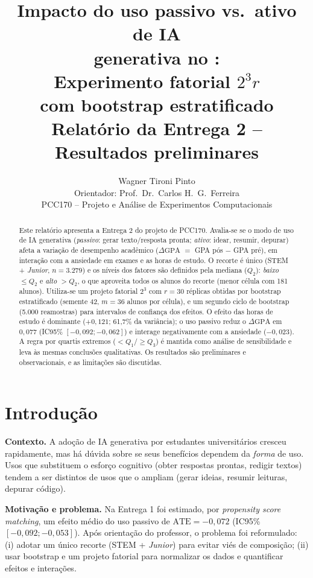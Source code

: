 \documentclass[12pt,a4paper]{article}
\title{\textbf{Impacto do uso passivo vs.\ ativo de IA\\generativa no \dgpa{}:\\Experimento fatorial $2^3 r$\\com bootstrap estratificado}\\[0.3em]
\large Relat\'orio da Entrega 2 -- Resultados preliminares}
\author{Wagner Tironi Pinto\\[0.2em]
\small Orientador: Prof.\ Dr.\ Carlos H.\ G.\ Ferreira\\
\small PCC170 -- Projeto e An\'alise de Experimentos Computacionais}
\date{}
\newcommand{\dgpa}{\ensuremath{\Delta\mathrm{GPA}}}
\begin{document}
\maketitle

\begin{abstract}
Este relat\'orio apresenta a Entrega 2 do projeto de PCC170. Avalia-se se o modo de uso de IA generativa
(\emph{passivo}: gerar texto/resposta pronta; \emph{ativo}: idear, resumir, depurar) afeta a varia\c{c}\~ao
de desempenho acad\^emico (\dgpa{} $=$ GPA p\'os $-$ GPA pr\'e), em interação com a ansiedade em exames e as horas de estudo.
O recorte \'e \'unico (STEM + \emph{Junior}, $n=3.279$) e os n\'iveis dos fatores s\~ao definidos pela mediana ($Q_2$):
\emph{baixo} $\le Q_2$ e \emph{alto} $>Q_2$, o que aproveita todos os alunos do recorte (menor c\'elula com 181 alunos).
Utiliza-se um projeto fatorial $2^3$ com $r=30$ r\'eplicas
obtidas por bootstrap estratificado (semente 42, $m=36$ alunos por c\'elula), e um segundo ciclo de bootstrap (5.000 reamostras)
para intervalos de confian\c{c}a dos efeitos. O efeito das horas de estudo \'e dominante ($+0{,}121$; 61,7\% da vari\^ancia);
o uso passivo reduz o \dgpa{} em $0{,}077$ (IC95\% $[-0{,}092;-0{,}062]$) e interage negativamente com a ansiedade
($-0{,}023$). A regra por quartis extremos ($<Q_1$/$\ge Q_3$) \'e mantida como an\'alise de sensibilidade e leva \`as mesmas conclus\~oes qualitativas.
Os resultados s\~ao preliminares e observacionais, e as limita\c{c}\~oes s\~ao discutidas.
\end{abstract}

\tableofcontents
\newpage

\section{Introdu\c{c}\~ao}
\textbf{Contexto.} A ado\c{c}\~ao de IA generativa por estudantes universit\'arios cresceu rapidamente, mas h\'a
d\'uvida sobre se seus benef\'icios dependem da \emph{forma} de uso. Usos que substituem o esfor\c{c}o cognitivo
(obter respostas prontas, redigir textos) tendem a ser distintos de usos que o ampliam (gerar ideias, resumir leituras, depurar c\'odigo).

\textbf{Motiva\c{c}\~ao e problema.} Na Entrega 1 foi estimado, por \emph{propensity score matching}, um efeito m\'edio
do uso passivo de $\text{ATE}=-0{,}072$ (IC95\% $[-0{,}092;-0{,}053]$). Ap\'os orienta\c{c}\~ao do professor, o problema foi
reformulado: (i) adotar um \'unico recorte (STEM + \emph{Junior}) para evitar vi\'es de composi\c{c}\~ao; (ii) usar
bootstrap e um projeto fatorial para normalizar os dados e quantificar efeitos e intera\c{c}\~oes.
\end{document}
